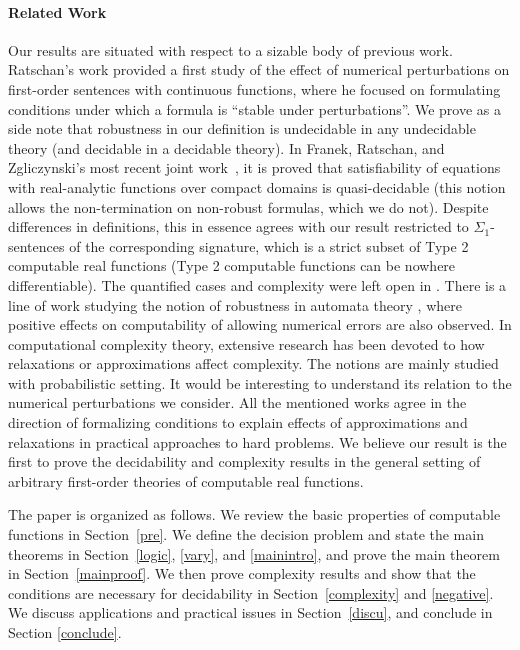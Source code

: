 \documentclass[conference]{IEEEtran}
\begin{document}
\paragraph*{Related Work} Our results are situated with respect to a sizable body of previous work. Ratschan's work \cite{DBLP:journals/jsc/Ratschan02} provided a first study of the effect of numerical perturbations on first-order sentences with continuous functions, where he focused on formulating conditions under which a formula is ``stable under perturbations''. We prove as a side note that robustness in our definition is undecidable in any undecidable theory (and decidable in a decidable theory). In Franek, Ratschan, and Zgliczynski's most recent joint work~\cite{DBLP:conf/mfcs/FranekRZ11}, it is proved that satisfiability of equations with real-analytic functions over compact domains is quasi-decidable (this notion allows the non-termination on non-robust formulas, which we do not). Despite differences in definitions, this in essence agrees with our result restricted to $\Sigma_1$-sentences of the corresponding signature, which is a strict subset of Type 2 computable real functions (Type 2 computable functions can be nowhere differentiable). The quantified cases and complexity were left open in \cite{DBLP:conf/mfcs/FranekRZ11}. There is a line of work studying the notion of robustness in automata theory \cite{DBLP:conf/icalp/AsarinC05,DBLP:conf/csl/Franzle99,DBLP:conf/lics/AsarinB01}, where positive effects on computability of allowing numerical errors are also observed. In computational complexity theory, extensive research has been devoted to how relaxations or approximations affect complexity. The notions are mainly studied with probabilistic setting. It would be interesting to understand its relation to the numerical perturbations we consider. All the mentioned works agree in the direction of formalizing conditions to explain effects of approximations and relaxations in practical approaches to hard problems. We believe our result is the first to prove the decidability and complexity results in the general setting of arbitrary first-order theories of computable real functions. 


The paper is organized as follows. We review the basic properties of computable functions in Section~\ref{pre}. We define the decision problem and state the main theorems in Section~\ref{logic}, \ref{vary}, and \ref{mainintro}, and prove the main theorem in Section~\ref{mainproof}. We then prove complexity results and show that the conditions are necessary for decidability in Section~\ref{complexity} and \ref{negative}. We discuss applications and practical issues in Section~\ref{discu}, and conclude in Section \ref{conclude}. 
\end{document}
